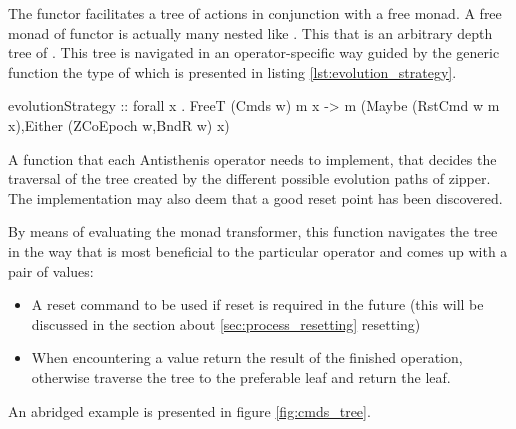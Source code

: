 The  functor facilitates a tree of actions in conjunction with a
free monad.  A free monad of functor  is actually many
 nested like . This that
 is an arbitrary depth tree of . This
tree is navigated in an operator-specific way guided by the generic
function  the type of which is presented in
listing \ref{lst:evolution_strategy}.

\begin{code}
\begin{haskellcode}
evolutionStrategy
  :: forall x .
  FreeT (Cmds w) m x
  -> m (Maybe (RstCmd w m x),Either (ZCoEpoch w,BndR w) x)
\end{haskellcode}
  \caption{\label{lst:evolution_strategy}A function that each
    Antisthenis operator needs to implement, that decides the traversal of
    the tree created by the different possible evolution paths of
    zipper. The implementation may also deem that a good reset point
    has been discovered.}
\end{code}

By means of evaluating the  monad transformer,
this function navigates the tree in the way that is most beneficial to
the particular operator and comes up with a pair of values:

\begin{itemize}
\item A reset command to be used if reset is required in the future
  (this will be discussed in the section about
  \ref{sec:process_resetting} resetting)
\item When encountering a  value return the result of the
finished operation, otherwise traverse the tree to the preferable
leaf and return the leaf.
\end{itemize}

An abridged example is presented in figure \ref{fig:cmds_tree}.

